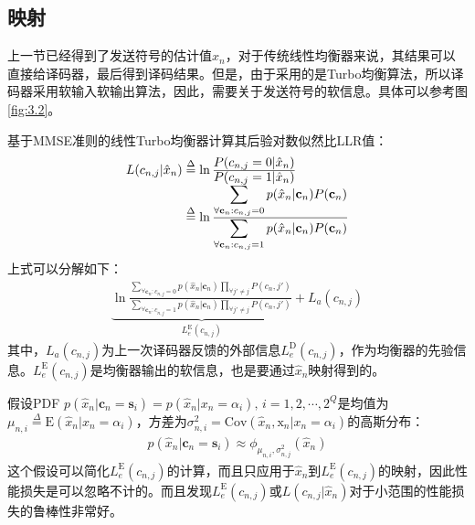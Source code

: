 \subsection{映射}
上一节已经得到了发送符号的估计值$\hat{x}_n$，对于传统线性均衡器来说，其结果可以直接给译码器，最后得到译码结果。但是，由于采用的是Turbo均衡算法，所以译码器采用软输入软输出算法，因此，需要关于发送符号的软信息。具体可以参考图\ref{fig:3.2}。

基于MMSE准则的线性Turbo均衡器计算其后验对数似然比LLR值：
\begin{eqnarray}
    \begin{array}{l@{\;\overset{\Delta}{=}\;}l}
        L(c_{n,j}|\hat{x}_n)&\ln\frac{\displaystyle P(c_{n,j}=0|\hat{x}_n)}{\displaystyle P(c_{n,j}=1|\hat{x}_n)}\\
        &\ln\frac{\displaystyle\sum_{\forall\mathbf{c}_n:c_{n,j}=0}p(\hat{x}_n|\mathbf{c}_n)P(\mathbf{c}_n)}{\displaystyle\sum_{\forall\mathbf{c}_n:c_{n,j}=1}p(\hat{x}_n|\mathbf{c}_n)P(\mathbf{c}_n)}
    \end{array}
    \label{equ:3.17}
\end{eqnarray}
上式可以分解如下：
\begin{eqnarray}
      \underbrace{\ln\frac{\displaystyle\sum_{\forall\mathbf{c}_n:c_{n,j}=0}p(\hat{x}_n|\mathbf{c}_n)\prod_{\forall
    {j}'\neq
    j}P(c_n,{j}')}{\displaystyle\sum_{\forall\mathbf{c}_n:c_{n,j}=1}p(\hat{x}_n|\mathbf{c}_n)\prod_{\forall
    {j}'\neq j}P(c_n,{j}')}}_{L_e^{\mathrm{E}}(c_{n,j})}+L_a(c_{n,j})    
    \label{equ:3.18}
\end{eqnarray}
其中，$L_a(c_{n,j})$为上一次译码器反馈的外部信息$L_e^{\mathrm{D}}(c_{n,j})$，作为均衡器的先验信息。$L_e^{\mathrm{E}}(c_{n,j})$是均衡器输出的软信息，也是要通过$\hat{x}_n$映射得到的。

假设PDF
$p(\hat{x}_n|\mathbf{c}_n=\mathbf{s}_i)=p(\hat{x}_n|x_n=\alpha_i),\,i=1,2,\cdots,2^Q$是均值为$\mu_{n,i}\overset{\Delta}{=}\mathrm{E}(\hat{x}_n|x_n=\alpha_i)$，方差为$\sigma_{n,i}^2=\mathrm{Cov}(\hat{x}_n,\mathrm{x}_n|x_n=\alpha_i)$的高斯分布：
\begin{eqnarray}
    p(\hat{x}_n|\mathbf{c}_n=\mathbf{s}_i)\approx\phi_{\mu_{n,i},\sigma_{n,j}^2}(\hat{x}_n)
    \label{equ:3.19}
\end{eqnarray}
这个假设可以简化$L_e^{\mathrm{E}}(c_{n,j})$的计算，而且只应用于$\hat{x}_n$到$L_e^{\mathrm{E}}(c_{n,j})$的映射，因此性能损失是可以忽略不计的。而且发现$L_e^{\mathrm{E}}(c_{n,j})$或$L(c_{n,j}|\hat{x}_n)$对于小范围的性能损失的鲁棒性非常好。

